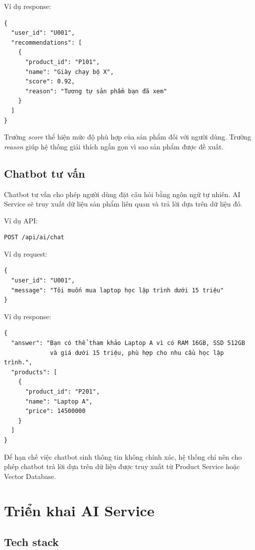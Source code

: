\documentclass[../main.tex]{subfiles}
\begin{document}
Ví dụ response:

\begin{verbatim}
{
  "user_id": "U001",
  "recommendations": [
    {
      "product_id": "P101",
      "name": "Giày chạy bộ X",
      "score": 0.92,
      "reason": "Tương tự sản phẩm bạn đã xem"
    }
  ]
}
\end{verbatim}

Trường \textit{score} thể hiện mức độ phù hợp của sản phẩm đối với người dùng. Trường \textit{reason} giúp hệ thống giải thích ngắn gọn vì sao sản phẩm được đề xuất.

\subsection{Chatbot tư vấn}

Chatbot tư vấn cho phép người dùng đặt câu hỏi bằng ngôn ngữ tự nhiên. AI Service sẽ truy xuất dữ liệu sản phẩm liên quan và trả lời dựa trên dữ liệu đó.

Ví dụ API:

\begin{verbatim}
POST /api/ai/chat
\end{verbatim}

Ví dụ request:

\begin{verbatim}
{
  "user_id": "U001",
  "message": "Tôi muốn mua laptop học lập trình dưới 15 triệu"
}
\end{verbatim}

Ví dụ response:

\begin{verbatim}
{
  "answer": "Bạn có thể tham khảo Laptop A vì có RAM 16GB, SSD 512GB
             và giá dưới 15 triệu, phù hợp cho nhu cầu học lập trình.",
  "products": [
    {
      "product_id": "P201",
      "name": "Laptop A",
      "price": 14500000
    }
  ]
}
\end{verbatim}

Để hạn chế việc chatbot sinh thông tin không chính xác, hệ thống chỉ nên cho phép chatbot trả lời dựa trên dữ liệu được truy xuất từ Product Service hoặc Vector Database.

\section{Triển khai AI Service}

\subsection{Tech stack}
\end{document}
